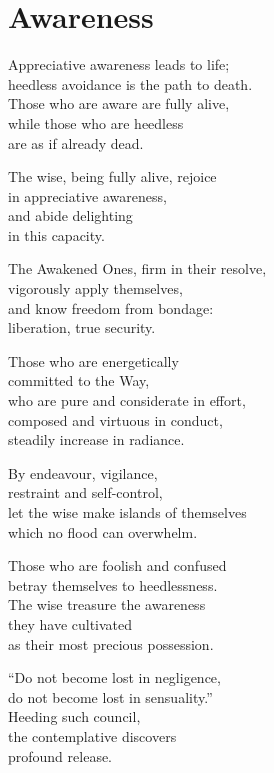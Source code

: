 
\chapter{Awareness}

Appreciative awareness leads to life;\\
heedless avoidance is the path to death.\\
Those who are aware are fully alive,\\
while those who are heedless\\
are as if already dead.

The wise, being fully alive, rejoice\\
in appreciative awareness,\\
and abide delighting\\
in this capacity.


The Awakened Ones, firm in their resolve,\\
vigorously apply themselves,\\
and know freedom from bondage:\\
liberation, true security.


Those who are energetically\\
committed to the Way,\\
who are pure and considerate in effort,\\
composed and virtuous in conduct,\\
steadily increase in radiance.


By endeavour, vigilance,\\
restraint and self-control,\\
let the wise make islands of themselves\\
which no flood can overwhelm.



Those who are foolish and confused\\
betray themselves to heedlessness.\\
The wise treasure the awareness\\
they have cultivated\\
as their most precious possession.


“Do not become lost in negligence,\\
do not become lost in sensuality.”\\
Heeding such council,\\
the contemplative discovers\\
profound release.

